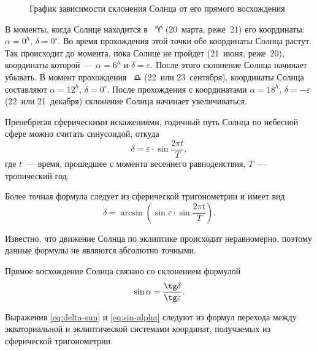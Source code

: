 \begin{wrapfigure}[12]{r}{0.5\tw}
	\centering
	\vspace{-.9pc}
	\caption{График зависимости склонения Солнца от его прямого восхождения}
\end{wrapfigure}
В моменты, когда Солнце находится в ~$\aries$  (20~марта, реже~21) его координаты: $\alpha=0^h$, $\delta=0^{\circ}$. Во время прохождения этой точки обе координаты Солнца растут. Так происходит до момента, пока Солнце не пройдет  (21~июня, реже~20), координаты которой~--- $\alpha=6^h$ и $\delta=\varepsilon$. После этого склонение Солнца начинает убывать. В момент прохождения ~$\libra$ (22~или 23~сентября), координаты Солнца составляют $\alpha=12^h$, $\delta=0^{\circ}$. После прохождения  с координатами $\alpha=18^h$, $\delta=-\varepsilon$ (22~или 21~декабря) склонение Солнца начинает увеличиваться.

Пренебрегая сферическими искажениями, годичный путь Солнца по небесной сфере можно считать синусоидой, откуда
\begin{equation}
	\delta=\varepsilon\cdot\sin \frac{2 \pi t}{T},
\end{equation}
где $t$~--- время, прошедшее с момента весеннего равноденствия, $T$~--- тропический год.

Более точная формула следует из сферической тригонометрии и имеет вид
\begin{equation}
	\delta=\arcsin\left(\sin\varepsilon\cdot\sin \frac{2 \pi t}{T}\right).
	\label{eq:delta-sun}
\end{equation}

Известно, что движение Солнца по эклиптике происходит неравномерно, поэтому данные формулы не являются абсолютно точными.

Прямое восхождение Солнца связано со склонением формулой
\begin{equation}
	\sin\alpha=\frac{\tg\delta}{\tg\varepsilon}.
	\label{eq:sin-alpha}
\end{equation}

Выражения \eqref{eq:delta-sun} и \eqref{eq:sin-alpha} следуют из формул перехода между экваториальной и эклиптической системами координат, получаемых из сферической тригонометрии.
